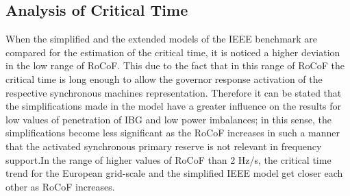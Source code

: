 
\subsection{Analysis of Critical Time}


When the simplified and the extended models of the IEEE benchmark are compared for the estimation of the critical time, it is noticed a higher deviation in the low range of RoCoF. This due to the fact that in this range of RoCoF the critical time is long enough to allow the governor response activation of the respective synchronous machines representation. Therefore it can be stated that the simplifications made in the model have a greater influence on the results for low values of penetration of IBG and low power imbalances; in this sense, the simplifications become less significant as the RoCoF increases in such a manner that the activated synchronous primary reserve is not relevant in frequency support.In the range of higher values of RoCoF than 2 Hz/s, the critical time trend for the European grid-scale and the simplified IEEE model get closer each other as RoCoF increases.\\


